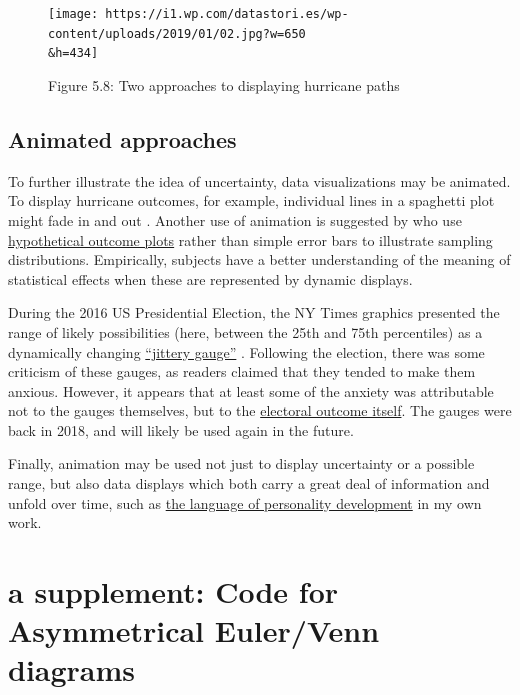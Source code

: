 \documentclass[
  openany]{book}
\begin{document}
\begin{figure}
\centering
\texttt{[image: https://i1.wp.com/datastori.es/wp-content/uploads/2019/01/02.jpg?w=650\\\&h=434]}
\caption{Figure 5.8: Two approaches to displaying hurricane paths}
\end{figure}

\hypertarget{animated-approaches}{%
\subsection{Animated approaches}\label{animated-approaches}}

To further illustrate the idea of uncertainty, data visualizations may be animated. To display hurricane outcomes, for example, individual lines in a spaghetti plot might fade in and out \citep[see][]{cox2013visualizing}. Another use of animation is suggested by \citep{hullman2015hypothetical} who use \href{https://cdn-images-1.medium.com/max/600/1*vol7-537cqnpucRgBP-j9A.gif}{hypothetical outcome plots} rather than simple error bars to illustrate sampling distributions. Empirically, subjects have a better understanding of the meaning of statistical effects when these are represented by dynamic displays.

During the 2016 US Presidential Election, the NY Times graphics presented the range of likely possibilities (here, between the 25th and 75th percentiles) as a dynamically changing \href{https://www.vis4.net/blog/images/old/jitter4.gif}{``jittery gauge''} . Following the election, there was some criticism of these gauges, as readers claimed that they tended to make them anxious. However, it appears that at least some of the anxiety was attributable not to the gauges themselves, but to the \href{https://www.vis4.net/blog/2016/11/jittery-gauges-election-forecast/}{electoral outcome itself}. The gauges were back in 2018, and will likely be used again in the future.

Finally, animation may be used not just to display uncertainty or a possible range, but also data displays which both carry a great deal of information and unfold over time, such as \href{http://wise.fau.edu/~lanning/EgoDevelopmentsmallest.gif}{the language of personality development} in my own work.

\hypertarget{a-supplement-code-for-asymmetrical-eulervenn-diagrams}{%
\section{a supplement: Code for Asymmetrical Euler/Venn diagrams}\label{a-supplement-code-for-asymmetrical-eulervenn-diagrams}}
\end{document}
